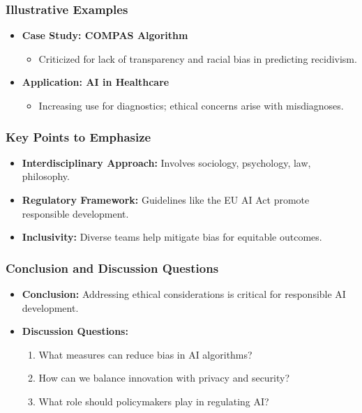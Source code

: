 \documentclass[aspectratio=169]{beamer}
\begin{document}
\begin{frame}[fragile]
    \frametitle{Illustrative Examples}
    \begin{itemize}
        \item \textbf{Case Study: COMPAS Algorithm}
            \begin{itemize}
                \item Criticized for lack of transparency and racial bias in predicting recidivism.
            \end{itemize}
        
        \item \textbf{Application: AI in Healthcare}
            \begin{itemize}
                \item Increasing use for diagnostics; ethical concerns arise with misdiagnoses.
            \end{itemize}
    \end{itemize}
\end{frame}

\begin{frame}[fragile]
    \frametitle{Key Points to Emphasize}
    \begin{itemize}
        \item \textbf{Interdisciplinary Approach:} Involves sociology, psychology, law, philosophy.
        \item \textbf{Regulatory Framework:} Guidelines like the EU AI Act promote responsible development.
        \item \textbf{Inclusivity:} Diverse teams help mitigate bias for equitable outcomes.
    \end{itemize}
\end{frame}

\begin{frame}[fragile]
    \frametitle{Conclusion and Discussion Questions}
    \begin{itemize}
        \item \textbf{Conclusion:} Addressing ethical considerations is critical for responsible AI development.
        \item \textbf{Discussion Questions:}
            \begin{enumerate}
                \item What measures can reduce bias in AI algorithms?
                \item How can we balance innovation with privacy and security?
                \item What role should policymakers play in regulating AI?
            \end{enumerate}
    \end{itemize}
\end{frame}
\end{document}
